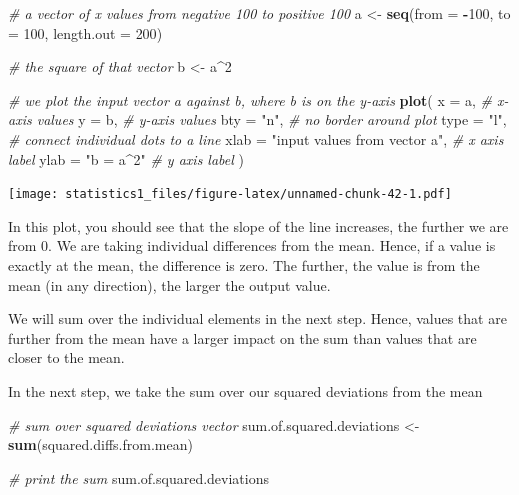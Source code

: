 \documentclass[]{book}
\newenvironment{Shaded}{\begin{snugshade}}{\end{snugshade}}
\newcommand{\KeywordTok}[1]{\textcolor[rgb]{0.13,0.29,0.53}{\textbf{#1}}}
\newcommand{\DataTypeTok}[1]{\textcolor[rgb]{0.13,0.29,0.53}{#1}}
\newcommand{\DecValTok}[1]{\textcolor[rgb]{0.00,0.00,0.81}{#1}}
\newcommand{\StringTok}[1]{\textcolor[rgb]{0.31,0.60,0.02}{#1}}
\newcommand{\CommentTok}[1]{\textcolor[rgb]{0.56,0.35,0.01}{\textit{#1}}}
\newcommand{\OperatorTok}[1]{\textcolor[rgb]{0.81,0.36,0.00}{\textbf{#1}}}
\newcommand{\NormalTok}[1]{#1}
\theoremstyle{definition}
\theoremstyle{definition}
\theoremstyle{definition}
\theoremstyle{remark}
\begin{document}
\begin{Shaded}
\begin{Highlighting}[]
\CommentTok{# a vector of x values from negative 100 to positive 100}
\NormalTok{a <-}\StringTok{ }\KeywordTok{seq}\NormalTok{(}\DataTypeTok{from =} \OperatorTok{-}\DecValTok{100}\NormalTok{, }\DataTypeTok{to =} \DecValTok{100}\NormalTok{, }\DataTypeTok{length.out =} \DecValTok{200}\NormalTok{)}

\CommentTok{# the square of that vector}
\NormalTok{b <-}\StringTok{ }\NormalTok{a}\OperatorTok{^}\DecValTok{2}

\CommentTok{# we plot the input vector a against b, where b is on the y-axis}
\KeywordTok{plot}\NormalTok{(}
  \DataTypeTok{x =}\NormalTok{ a, }\CommentTok{# x-axis values}
  \DataTypeTok{y =}\NormalTok{ b, }\CommentTok{# y-axis values}
  \DataTypeTok{bty =} \StringTok{"n"}\NormalTok{, }\CommentTok{# no border around plot}
  \DataTypeTok{type =} \StringTok{"l"}\NormalTok{, }\CommentTok{# connect individual dots to a line}
  \DataTypeTok{xlab =} \StringTok{"input values from vector a"}\NormalTok{, }\CommentTok{# x axis label}
  \DataTypeTok{ylab =} \StringTok{"b = a^2"} \CommentTok{# y axis label}
\NormalTok{)}
\end{Highlighting}
\end{Shaded}

\texttt{[image: statistics1\_files/figure-latex/unnamed-chunk-42-1.pdf]}

In this plot, you should see that the slope of the line increases, the
further we are from 0. We are taking individual differences from the
mean. Hence, if a value is exactly at the mean, the difference is zero.
The further, the value is from the mean (in any direction), the larger
the output value.

We will sum over the individual elements in the next step. Hence, values
that are further from the mean have a larger impact on the sum than
values that are closer to the mean.

In the next step, we take the sum over our squared deviations from the
mean

\begin{Shaded}
\begin{Highlighting}[]
\CommentTok{# sum over squared deviations vector}
\NormalTok{sum.of.squared.deviations <-}\StringTok{ }\KeywordTok{sum}\NormalTok{(squared.diffs.from.mean)}

\CommentTok{# print the sum}
\NormalTok{sum.of.squared.deviations}
\end{Highlighting}
\end{Shaded}
\end{document}
